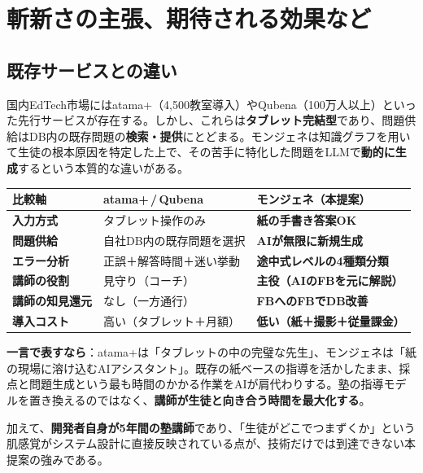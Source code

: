\documentclass[paper=a4,fontsize=10.5bp,jafontsize=10.5bp,twocolumn]{jlreq}
\begin{document}
\section{斬新さの主張、期待される効果など}

\subsection{既存サービスとの違い}

国内EdTech市場にはatama+（4,500教室導入）やQubena（100万人以上）といった先行サービスが存在する。しかし、これらは\textbf{タブレット完結型}であり、問題供給はDB内の既存問題の\textbf{検索・提供}にとどまる。モンジェネは知識グラフを用いて生徒の根本原因を特定した上で、その苦手に特化した問題をLLMで\textbf{動的に生成}するという本質的な違いがある。


\begin{footnotesize}\noindent
\begin{tabularx}{\linewidth}{>{\bfseries}l X X}
\toprule
比較軸 & atama+\,/\,Qubena & モンジェネ（本提案） \\
\midrule
入力方式 & タブレット操作のみ & \textbf{紙の手書き答案OK} \\
問題供給 & 自社DB内の既存問題を選択 & \textbf{AIが無限に新規生成} \\
エラー分析 & 正誤＋解答時間＋迷い挙動 & \textbf{途中式レベルの4種類分類} \\
講師の役割 & 見守り（コーチ） & \textbf{主役（AIのFBを元に解説）} \\
講師の知見還元 & なし（一方通行） & \textbf{FBへのFBでDB改善} \\
導入コスト & 高い（タブレット＋月額） & \textbf{低い（紙＋撮影＋従量課金）} \\
\bottomrule
\end{tabularx}
\end{footnotesize}


\begin{highlightbox}
\textbf{一言で表すなら}：atama+は「タブレットの中の完璧な先生」、モンジェネは「紙の現場に溶け込むAIアシスタント」。既存の紙ベースの指導を活かしたまま、採点と問題生成という最も時間のかかる作業をAIが肩代わりする。塾の指導モデルを置き換えるのではなく、\textbf{講師が生徒と向き合う時間を最大化する}。
\end{highlightbox}

\noindent
加えて、\textbf{開発者自身が5年間の塾講師}であり、「生徒がどこでつまずくか」という肌感覚がシステム設計に直接反映されている点が、技術だけでは到達できない本提案の強みである。
\end{document}
